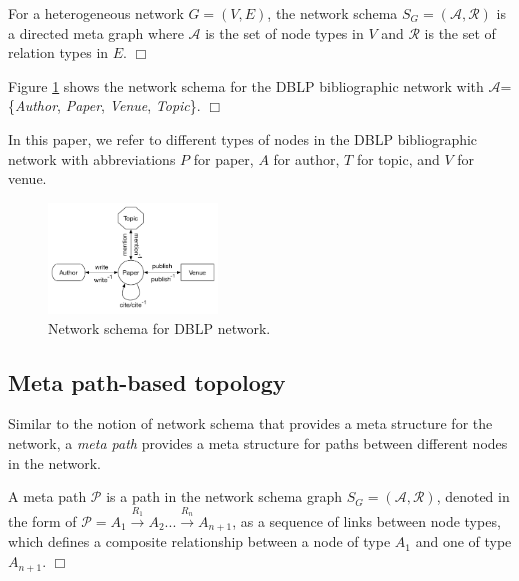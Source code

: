 \begin{definition}
For a heterogeneous network $G=(V,E)$, the network schema $S_G=\mathcal{(A,R)}$ is a directed meta graph where $\mathcal{A}$ is the set of node types in $V$ and $\mathcal{R}$ is the set of relation types in $E$.  $\Box$
\end{definition}

\begin{example}
Figure \ref{schema} shows the network schema for the DBLP bibliographic network with $\mathcal{A}$=\{\textit{Author}, \textit{Paper}, \textit{Venue}, \textit{Topic}\}. $\Box$
\end{example}

In this paper, we refer to different types of nodes in the DBLP bibliographic network with abbreviations $P$ for paper, $A$ for author, $T$ for topic, and $V$ for venue. 

\begin{figure}[t]
  \centering
      \includegraphics[width=0.4\textwidth]{figs/schema.pdf}
  \caption{Network schema for DBLP network.}\label{schema}
\end{figure}

\subsection{Meta path-based topology}

Similar to the notion of network schema that provides a meta structure for the network, a \textit{meta path} \cite{sun2011pathsim} provides a meta structure for paths between different nodes in the network. 

\begin{definition}
A meta path $\mathcal{P}$ is a path in the network schema graph $S_G = (\mathcal{A,R})$, denoted in the form of $\mathcal{P} = A_1 \xrightarrow{R_1} A_2... \xrightarrow{R_n} A_{n+1}$, as a sequence of links between node types, which defines a composite relationship between a node of type $A_1$ and one of type $A_{n+1}$. $\Box$
\end{definition}




